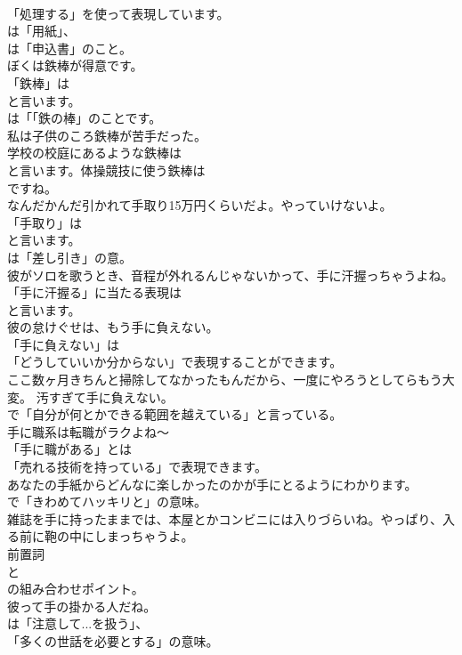 \documentclass[8pt]{extreport}
\begin{document}
\begin{CJK}{UTF8}{min}
\\	「処理する」を使って表現しています。
\\	は「用紙」、
\\	は「申込書」のこと。	
\\	ぼくは鉄棒が得意です。 
\\	「鉄棒」は
\\	と言います。
\\	は「「鉄の棒」のことです。	
\\	私は子供のころ鉄棒が苦手だった。 
\\	学校の校庭にあるような鉄棒は
\\	と言います。体操競技に使う鉄棒は
\\	ですね。	
\\	なんだかんだ引かれて手取り15万円くらいだよ。やっていけないよ。 
\\	「手取り」は 
\\	と言います。
\\	は「差し引き」の意。	
\\	彼がソロを歌うとき、音程が外れるんじゃないかって、手に汗握っちゃうよね。 
\\	「手に汗握る」に当たる表現は
\\	と言います。	
\\	彼の怠けぐせは、もう手に負えない。 
\\	「手に負えない」は
\\	「どうしていいか分からない」で表現することができます。	
\\	ここ数ヶ月きちんと掃除してなかったもんだから、一度にやろうとしてらもう大変。 汚すぎて手に負えない。 
\\	で「自分が何とかできる範囲を越えている」と言っている。	
\\	手に職系は転職がラクよね～ 
\\	「手に職がある」とは
\\	「売れる技術を持っている」で表現できます。	
\\	あなたの手紙からどんなに楽しかったのかが手にとるようにわかります。 
\\	で「きわめてハッキリと」の意味。	
\\	雑誌を手に持ったままでは、本屋とかコンビニには入りづらいね。やっぱり、入る前に鞄の中にしまっちゃうよ。 
\\	前置詞
\\	と
\\	の組み合わせポイント。	
\\	彼って手の掛かる人だね。 
\\	は「注意して...を扱う」、
\\	「多くの世話を必要とする」の意味。	

\end{CJK}
\end{document}
